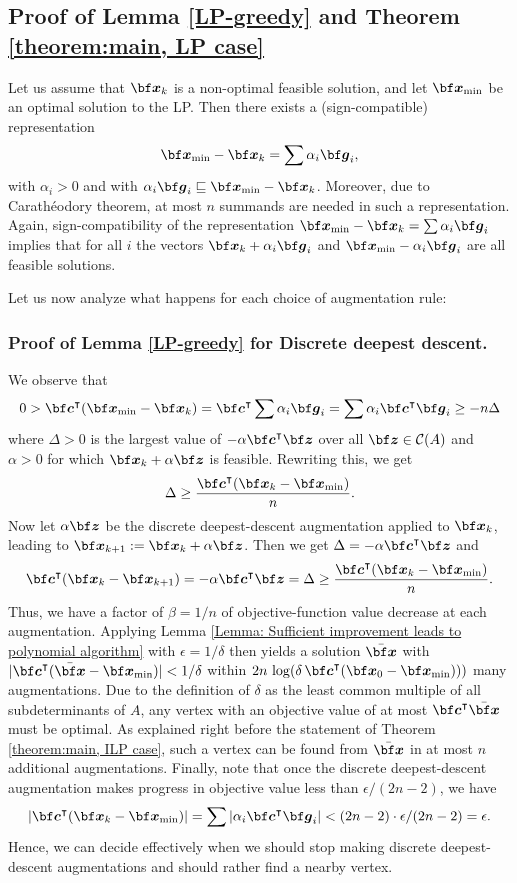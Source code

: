 \documentclass[moor]{informs1hack}              %
\def\Circuits{{\mathcal C}}
\def\ve#1{\mathchoice{\mbox{\boldmath$\displaystyle\bf#1$}}
{\mbox{\boldmath$\textstyle\bf#1$}}
{\mbox{\boldmath$\scriptstyle\bf#1$}}
{\mbox{\boldmath$\scriptscriptstyle\bf#1$}}}
\newcommand\vecc{{\ve c}}
\newcommand\veg{{\ve g}}
\newcommand\vex{{\ve x}}
\newcommand\vez{{\ve z}}
\newcommand{\red}{\sqsubseteq}
\newcommand{\T}{{\intercal}} %
\begin{document}
\subsection{Proof of Lemma \ref{LP-greedy} and Theorem \ref{theorem:main, LP case}}

Let us assume that $\vex_k$ is a non-optimal feasible solution, and let $\vex_{\min}$ be an optimal solution to the LP. Then there exists a (sign-compatible) representation
\[
  \vex_{\min} -  \vex_k =\sum\alpha_i\veg_i,
\]
with $\alpha_i>0$ and with $\alpha_i\veg_i\red \vex_{\min} - \vex_k$. Moreover, due to Carath\'eodory theorem, at most $n$ summands are needed in such a representation.
Again, sign-compatibility of the representation $\vex_{\min}-\vex_k =\sum\alpha_i\veg_i$ implies that for all $i$ the vectors $\vex_{k}+\alpha_i\veg_i$ and $\vex_{\min}-\alpha_i\veg_i$ are all feasible solutions.

Let us now analyze what happens for each choice of augmentation rule:

\subsubsection{Proof of Lemma \ref{LP-greedy} for Discrete deepest descent.} We observe that
\[
  0>\vecc^\T (\vex_{\min}-\vex_k)
   =\vecc^\T \sum\alpha_i\veg_i
   = \sum\alpha_i\vecc^\T\veg_i
   \geq -n\Delta
\]
where $\Delta>0$ is the largest value of $-\alpha\vecc^\T\vez$ over all $\vez\in\Circuits(A)$ and $\alpha>0$ for which $\vex_k+\alpha\vez$ is feasible. Rewriting this, we get
\[
  \Delta\geq\frac{\vecc^\T (\vex_k-\vex_{\min})}n.
\]
Now let $\alpha\vez$ be the discrete deepest-descent augmentation applied to $\vex_k$, leading to $\vex_{k+1}:=\vex_k+\alpha\vez$. Then we get $\Delta=-\alpha\vecc^\T\vez$ and
\[
  \vecc^\T (\vex_k-\vex_{k+1})=-\alpha\vecc^\T\vez=\Delta
  \geq\frac{\vecc^\T (\vex_k-\vex_{\min})}n.
\]
Thus, we have a factor of $\beta=1/n$ of objective-function value decrease at each augmentation. Applying Lemma \ref{Lemma: Sufficient improvement leads to polynomial algorithm} with $\epsilon=1/\delta$ then yields a solution $\bar\vex$ with $|\vecc^\T(\bar\vex-\vex_{\min})|<1/\delta$ within $2n\,\log(\delta\,\vecc^\T (\vex_0-\vex_{\min})))$ many augmentations. Due to the definition of $\delta$ as the least common multiple of all subdeterminants of $A$, any vertex with an objective value of at most $\vecc^\T\bar\vex$ must be optimal. As explained right before the statement of Theorem \ref{theorem:main, ILP case}, such a vertex can be found from $\bar\vex$ in at most $n$ additional augmentations. Finally, note that once the discrete deepest-descent augmentation makes progress in objective value less than $\epsilon/(2n-2)$, we have
\[
  |\vecc^\T(\vex_k-\vex_{\min})|=\sum|\alpha_i\vecc^\T\veg_i| <(2n-2)\cdot\epsilon/(2n-2)=\epsilon.
\]
Hence, we can decide effectively when we should stop making discrete deepest-descent augmentations and should rather find a nearby vertex.
\end{document}
